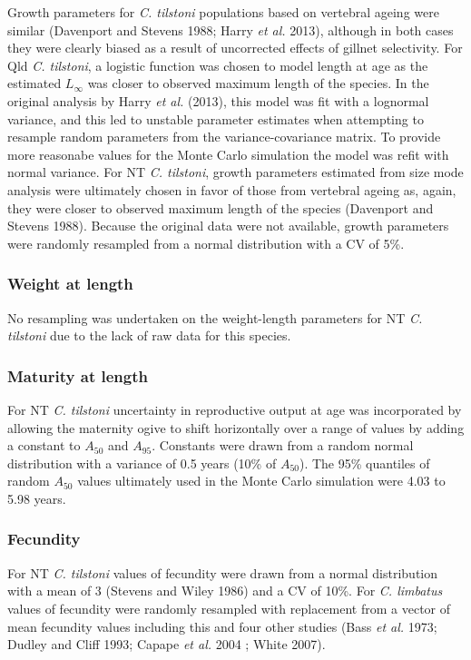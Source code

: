 \documentclass[]{article}
\begin{document}
Growth parameters for \emph{C. tilstoni} populations based on vertebral
ageing were similar (Davenport and Stevens 1988; Harry \emph{et al.}
2013), although in both cases they were clearly biased as a result of
uncorrected effects of gillnet selectivity. For Qld \emph{C. tilstoni},
a logistic function was chosen to model length at age as the estimated
\(L_\infty\) was closer to observed maximum length of the species. In
the original analysis by Harry \emph{et al.} (2013), this model was fit
with a lognormal variance, and this led to unstable parameter estimates
when attempting to resample random parameters from the
variance-covariance matrix. To provide more reasonabe values for the
Monte Carlo simulation the model was refit with normal variance. For NT
\emph{C. tilstoni}, growth parameters estimated from size mode analysis
were ultimately chosen in favor of those from vertebral ageing as,
again, they were closer to observed maximum length of the species
(Davenport and Stevens 1988). Because the original data were not
available, growth parameters were randomly resampled from a normal
distribution with a CV of 5\%.

\subsubsection{Weight at length}\label{weight-at-length}

No resampling was undertaken on the weight-length parameters for NT
\emph{C. tilstoni} due to the lack of raw data for this species.

\subsubsection{Maturity at length}\label{maturity-at-length}

For NT \emph{C. tilstoni} uncertainty in reproductive output at age was
incorporated by allowing the maternity ogive to shift horizontally over
a range of values by adding a constant to \(A_{50}\) and \(A_{95}\).
Constants were drawn from a random normal distribution with a variance
of 0.5 years (10\% of \(A_{50}\)). The 95\% quantiles of random
\(A_{50}\) values ultimately used in the Monte Carlo simulation were
4.03 to 5.98 years.

\subsubsection{Fecundity}\label{fecundity}

For NT \emph{C. tilstoni} values of fecundity were drawn from a normal
distribution with a mean of 3 (Stevens and Wiley 1986) and a CV of 10\%.
For \emph{C. limbatus} values of fecundity were randomly resampled with
replacement from a vector of mean fecundity values including this and
four other studies (Bass \emph{et al.} 1973; Dudley and Cliff 1993;
Capape \emph{et al.} 2004 ; White 2007).
\end{document}

